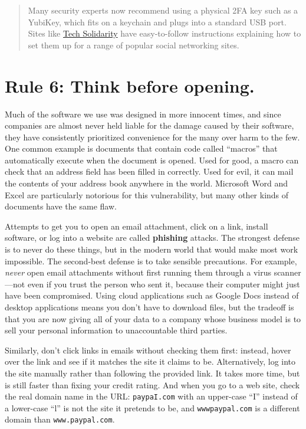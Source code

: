 \documentclass[10pt,letterpaper]{article}
\begin{document}
\begin{quote}
  Many security experts now recommend using a physical 2FA key such as a YubiKey,
  which fits on a keychain and plugs into a standard USB port.
  Sites like \href{https://techsolidarity.org/}{Tech Solidarity} have easy-to-follow instructions
  explaining how to set them up for a range of popular social networking sites.
\end{quote}

\section*{Rule 6: Think before opening.}

Much of the software we use was designed in more innocent times,
and since companies are almost never held liable for the damage caused by their software,
they have consistently prioritized convenience for the many over harm to the few.
One common example is documents that contain code called ``macros''
that automatically execute when the document is opened.
Used for good,
a macro can check that an address field has been filled in correctly.
Used for evil,
it can mail the contents of your address book anywhere in the world.
Microsoft Word and Excel are particularly notorious for this vulnerability,
but many other kinds of documents have the same flaw.

Attempts to get you to open an email attachment,
click on a link,
install software,
or log into a website are called \textbf{phishing} attacks.
The strongest defense is to never do these things,
but in the modern world that would make most work impossible.
The second-best defense is to take sensible precautions.
For example,
\emph{never} open email attachments without first running them through a virus scanner---not even
if you trust the person who sent it,
because their computer might just have been compromised.
Using cloud applications such as Google Docs instead of desktop applications means you don't have to download files,
but the tradeoff is that you are now giving all of your data to a company
whose business model is to sell your personal information to unaccountable third parties.

Similarly,
don't click links in emails without checking them first:
instead,
hover over the link and see if it matches the site it claims to be.
Alternatively,
log into the site manually rather than following the provided link.
It takes more time,
but is still faster than fixing your credit rating.
And when you go to a web site,
check the real domain name in the URL:
\texttt{paypaI.com} with an upper-case ``I'' instead of a lower-case ``l'' is not the site it pretends to be,
and \texttt{wwwpaypal.com} is a different domain than \texttt{www.paypal.com}.
\end{document}
